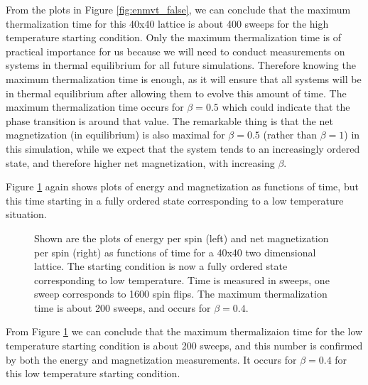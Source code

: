 \documentclass[11pt,a4paper]{article}
\begin{document}
From the plots in Figure \ref{fig:enmvt_false}, we can conclude that the maximum thermalization time for this 40x40 lattice is about 400 sweeps for the high temperature starting condition. Only the maximum thermalization time is of practical importance for us because we will need to
 conduct measurements on systems in thermal equilibrium for all future simulations. Therefore knowing the maximum thermalization time is
 enough, as it will ensure that all systems will be in thermal equilibrium after allowing them to evolve this amount of time. The maximum 
 thermalization time occurs for $\beta = 0.5$ which could indicate that the phase transition is around that value. The remarkable thing
 is that the net magnetization (in equilibrium) is also maximal for $\beta = 0.5$ (rather than $\beta = 1$) in this simulation, while we
 expect that the system tends to an increasingly ordered state, and therefore higher net magnetization, with increasing $\beta$. 



\pagebreak

Figure \ref{fig:enmvt_true} again shows plots of energy and magnetization as functions of time, but this time starting in a fully ordered
 state corresponding to a low temperature situation. 


\begin{figure}[H]

  \caption{Shown are the plots of energy per spin (left) and net magnetization per spin (right) as functions of time
    for a 40x40 two dimensional lattice. The starting condition is now a fully
    ordered state corresponding to low temperature. Time is measured in sweeps, one sweep corresponds to 1600 spin
    flips. The maximum thermalization time is about 200 sweeps, and occurs for $\beta = 0.4$.}

\label{fig:enmvt_true}
\end{figure}

From Figure \ref{fig:enmvt_true} we can conclude that the maximum thermalizaion time for the low temperature starting condition is about
 200 sweeps, and this number is confirmed by both the energy and magnetization measurements. It occurs for $\beta = 0.4$ for this low 
 temperature starting condition. 

\end{document}
